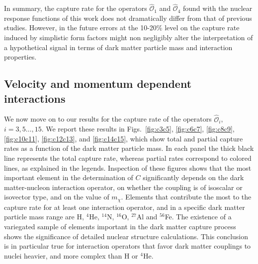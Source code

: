 \documentclass[11pt,a4paper]{article}
\begin{document}
In summary, the capture rate for the operators $\hat{\mathcal{O}}_1$ and $\hat{\mathcal{O}}_4$ found with the nuclear response functions of this work does not dramatically differ from that of previous studies. However, in the future errors at the 10-20\% level on the capture rate induced by simplistic form factors might non negligibly alter the interpretation of a hypothetical signal in terms of dark matter particle mass and interaction properties.

\subsection{Velocity and momentum dependent interactions}
We now move on to our results for the capture rate of the operators $\hat{\mathcal{O}}_i$, $i=3,5\dots,15$. We report these results in Figs.~\ref{fig:c3c5}, \ref{fig:c6c7}, \ref{fig:c8c9}, \ref{fig:c10c11}, \ref{fig:c12c13}, and \ref{fig:c14c15}, which show total and partial capture rates as a function of the dark matter particle mass. In each panel the thick black line represents the total capture rate, whereas partial rates correspond to colored lines, as explained in the legends. Inspection of these figures shows that the most important element in the determination of $C$ significantly depends on the dark matter-nucleon interaction operator, on whether the coupling is of isoscalar or isovector type, and on the value of $m_\chi$. Elements that contribute the most to the capture rate for at least one interaction operator, and in a specific dark matter particle mass range are H, $^{4}$He, $^{14}$N, $^{16}$O, $^{27}$Al and $^{56}$Fe. The existence of a variegated sample of elements important in the dark matter capture process shows the significance of detailed nuclear structure calculations. This conclusion is in particular true for interaction operators that favor dark matter couplings to nuclei heavier, and more complex than H or $^{4}$He. 
\end{document}
